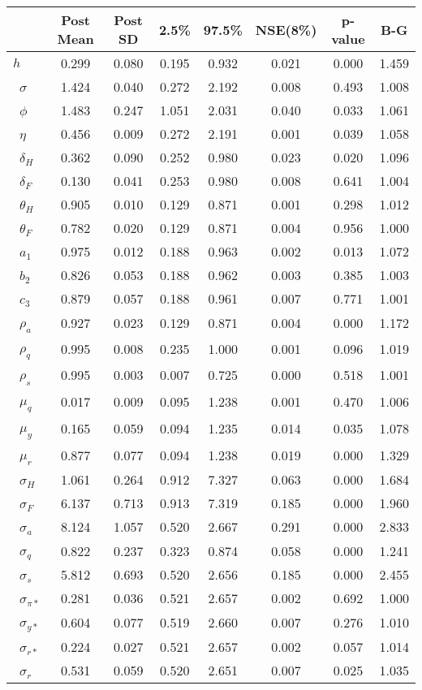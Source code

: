 \begin{tiny}\begin{tabular}{lccccccc}
\hline
&\textbf{Post Mean}&\textbf{Post SD}&\textbf{2.5\%}&\textbf{97.5\%}&\textbf{NSE(8\%)}&\textbf{p-value}&\textbf{B-G}\\\hline
\textbf{$ h             $}&0.299&0.080&0.195&0.932&0.021&0.000&1.459\\\
\textbf{$ \sigma        $}&1.424&0.040&0.272&2.192&0.008&0.493&1.008\\\
\textbf{$ \phi          $}&1.483&0.247&1.051&2.031&0.040&0.033&1.061\\\
\textbf{$ \eta          $}&0.456&0.009&0.272&2.191&0.001&0.039&1.058\\\
\textbf{$ \delta_{H}    $}&0.362&0.090&0.252&0.980&0.023&0.020&1.096\\\
\textbf{$ \delta_{F}    $}&0.130&0.041&0.253&0.980&0.008&0.641&1.004\\\
\textbf{$ \theta_{H}    $}&0.905&0.010&0.129&0.871&0.001&0.298&1.012\\\
\textbf{$ \theta_{F}    $}&0.782&0.020&0.129&0.871&0.004&0.956&1.000\\\
\textbf{$ a_{1}         $}&0.975&0.012&0.188&0.963&0.002&0.013&1.072\\\
\textbf{$ b_{2}         $}&0.826&0.053&0.188&0.962&0.003&0.385&1.003\\\
\textbf{$ c_{3}         $}&0.879&0.057&0.188&0.961&0.007&0.771&1.001\\\
\textbf{$ \rho_{a}      $}&0.927&0.023&0.129&0.871&0.004&0.000&1.172\\\
\textbf{$ \rho_{q}      $}&0.995&0.008&0.235&1.000&0.001&0.096&1.019\\\
\textbf{$ \rho_{s}      $}&0.995&0.003&0.007&0.725&0.000&0.518&1.001\\\
\textbf{$ \mu_{q}       $}&0.017&0.009&0.095&1.238&0.001&0.470&1.006\\\
\textbf{$ \mu_{y}       $}&0.165&0.059&0.094&1.235&0.014&0.035&1.078\\\
\textbf{$ \mu_{r}       $}&0.877&0.077&0.094&1.238&0.019&0.000&1.329\\\
\textbf{$ \sigma_{H}    $}&1.061&0.264&0.912&7.327&0.063&0.000&1.684\\\
\textbf{$ \sigma_{F}    $}&6.137&0.713&0.913&7.319&0.185&0.000&1.960\\\
\textbf{$ \sigma_{a}    $}&8.124&1.057&0.520&2.667&0.291&0.000&2.833\\\
\textbf{$ \sigma_{q}    $}&0.822&0.237&0.323&0.874&0.058&0.000&1.241\\\
\textbf{$ \sigma_{s}    $}&5.812&0.693&0.520&2.656&0.185&0.000&2.455\\\
\textbf{$ \sigma_{\pi*} $}&0.281&0.036&0.521&2.657&0.002&0.692&1.000\\\
\textbf{$ \sigma_{y*}   $}&0.604&0.077&0.519&2.660&0.007&0.276&1.010\\\
\textbf{$ \sigma_{r*}   $}&0.224&0.027&0.521&2.657&0.002&0.057&1.014\\\
\textbf{$ \sigma_{r}    $}&0.531&0.059&0.520&2.651&0.007&0.025&1.035\\\hline
\end{tabular}
\end{tiny}
